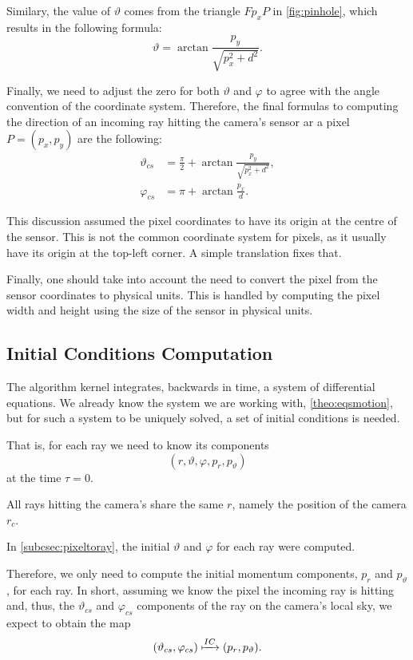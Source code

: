 Similary, the value of $\vartheta$ comes from the triangle $Fp_xP$ in \autoref{fig:pinhole}, which results in the following formula:
\[
	\vartheta = \arctan{\frac{p_y}{\sqrt{p_x^2 + d^2}}}.
\]

Finally, we need to adjust the zero for both $\vartheta$ and $\varphi$ to agree with the angle convention of the coordinate system. Therefore, the final formulas to computing the direction of an incoming ray hitting the camera's sensor ar a pixel $P = (p_x, p_y)$ are the following:
\begin{align}
	\vartheta_{cs} &= \frac{\pi}{2} + \arctan{\frac{p_y}{\sqrt{p_x^2 + d^2}}}, \\
	\varphi_{cs} &= \pi + \arctan{\frac{p_x}{d}}.
\end{align}

This discussion assumed the pixel coordinates to have its origin at the centre of the sensor. This is not the common coordinate system for pixels, as it usually have its origin at the top-left corner. A simple translation fixes that.

Finally, one should take into account the need to convert the pixel from the sensor coordinates to physical units. This is handled by computing the pixel width and height using the size of the sensor in physical units.

\subsection{Initial Conditions Computation}
\label{sec:initcond}
The algorithm kernel integrates, backwards in time, a system of differential equations. We already know the system we are working with, \autoref{theo:eqsmotion}, but for such a system to be uniquely solved, a set of initial conditions is needed.

That is, for each ray we need to know its components \[(r, \vartheta, \varphi, p_r, p_\vartheta)\] at the time $\tau = 0$.

All rays hitting the camera's share the same $r$, namely the position of the camera $r_c$.

In \autoref{subcsec:pixeltoray}, the initial $\vartheta$ and $\varphi$ for each ray were computed.

Therefore, we only need to compute the initial momentum components, $p_r$ and $p_\vartheta$, for each ray. In short, assuming we know the pixel the incoming ray is hitting and, thus, the $\vartheta_{cs}$ and $\varphi_{cs}$ components of the ray on the camera's local sky, we expect to obtain the map
\[
	(\vartheta_{cs}, \varphi_{cs}) \xmapsto{IC} (p_r, p_\vartheta).
\]

